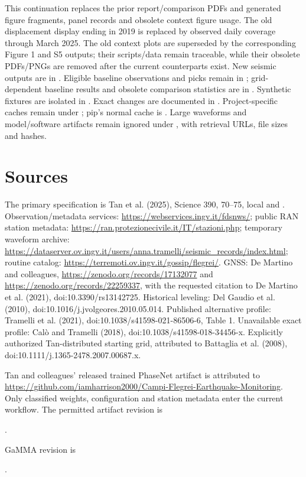 This continuation replaces the prior report/comparison PDFs and generated figure fragments, panel records and obsolete context figure usage. The old displacement display ending in 2019 is replaced by observed daily coverage through March 2025. The old context plots are superseded by the corresponding Figure 1 and S5 outputs; their scripts/data remain traceable, while their obsolete PDFs/PNGs are removed after the current counterparts exist. New seismic outputs are in . Eligible baseline observations and picks remain in ; grid-dependent baseline results and obsolete comparison statistics are in . Synthetic fixtures are isolated in . Exact changes are documented in . Project-specific caches remain under ; pip's normal cache is . Large waveforms and model/software artifacts remain ignored under , with retrieval URLs, file sizes and hashes.

\section{Sources}
The primary specification is Tan et al. (2025), Science 390, 70--75, local  and . Observation/metadata services: \url{https://webservices.ingv.it/fdsnws/}; public RAN station metadata: \url{https://ran.protezionecivile.it/IT/stazioni.php}; temporary waveform archive: \url{https://dataserver.ov.ingv.it/users/anna.tramelli/seismic_records/index.html}; routine catalog: \url{https://terremoti.ov.ingv.it/gossip/flegrei/}. GNSS: De Martino and colleagues, \url{https://zenodo.org/records/17132077} and \url{https://zenodo.org/records/22259337}, with the requested citation to De Martino et al. (2021), doi:10.3390/rs13142725. Historical leveling: Del Gaudio et al. (2010), doi:10.1016/j.jvolgeores.2010.05.014. Published alternative profile: Tramelli et al. (2021), doi:10.1038/s41598-021-86506-6, Table 1. Unavailable exact profile: Cal\`o and Tramelli (2018), doi:10.1038/s41598-018-34456-x. Explicitly authorized Tan-distributed starting grid, attributed to Battaglia et al. (2008), doi:10.1111/j.1365-2478.2007.00687.x.

Tan and colleagues' released trained PhaseNet artifact is attributed to \url{https://github.com/iamharrison2000/Campi-Flegrei-Earthquake-Monitoring}. Only classified weights, configuration and station metadata enter the current workflow. The permitted artifact revision is\par
\noindent{}.\par
GaMMA revision is\par
\noindent{}.\par
